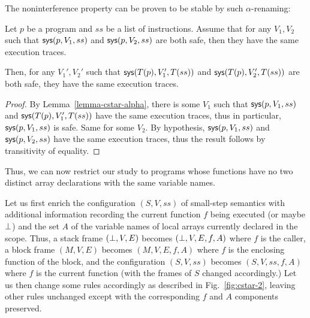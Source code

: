The noninterference property can be proven to be stable by such
$\alpha$-renaming:


\begin{lemma}
  Let $p$ be a \cstar program and $ss$ be a list of instructions. Assume
  that for any $V_1, V_2$ such that $\text{\textsf{sys}}(p, V_1, ss)$ and $\text{\textsf{sys}}(p,
  V_2, ss)$ are both safe, then they have the same execution
  traces.

  Then, for any $V_1', V_2'$ such that $\text{\textsf{sys}}(T(p), V_1', T(ss))$ and
  $\text{\textsf{sys}}(T(p), V_2', T(ss))$ are both safe, they have the same
  execution traces.
\end{lemma}
\begin{proof}
  By Lemma~\ref{lemma-cstar-alpha}, there is some $V_1$ such that
  $\text{\textsf{sys}}(p, V_1, ss)$ and $\text{\textsf{sys}}(T(p), V_1', T(ss))$ have the same
  execution traces, thus in particular, $\text{\textsf{sys}}(p, V_1, ss)$ is
  safe. Same for some $V_2$. By hypothesis, $\text{\textsf{sys}}(p, V_1, ss)$ and
  $\text{\textsf{sys}}(p, V_2, ss)$ have the same execution traces, thus the result
  follows by transitivity of equality.
\end{proof}

Thus, we can now restrict our study to \cstar programs whose functions
have no two distinct array declarations with the same variable names.

Let us first enrich the configuration $(S, V, ss)$ of \cstar small-step
semantics with additional information recording the current function
$f$ being executed (or maybe $\bot$) and the set $A$ of the variable
names of local arrays currently declared in the scope. Thus, a \cstar
stack frame $(\bot, V, E)$ becomes $(\bot, V, E, f, A)$ where $f$ is
the caller, a block frame $(M, V, E)$ becomes $(M, V, E, f, A)$ where
$f$ is the enclosing function of the block, and the configuration $(S,
V, ss)$ becomes $(S, V, ss, f, A)$ where $f$ is the current function
(with the frames of $S$ changed accordingly.) Let us then change some
rules accordingly as described in Fig.~\ref{fig:cstar-2}, leaving
other rules unchanged except with the corresponding $f$ and $A$
components preserved.

